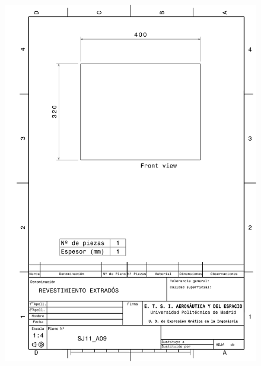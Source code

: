 \begin{figure}
    \centering
    \includegraphics[width=\linewidth]{Figures//Planos/REX.pdf}
\end{figure}


